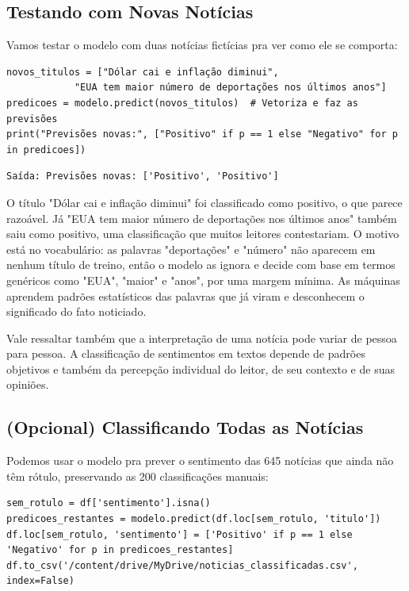 \documentclass[a4paper,12pt,openany]{book}
\begin{document}
\subsection{Testando com Novas Notícias}
Vamos testar o modelo com duas notícias fictícias pra ver como ele se comporta:

\begin{verbatim}
novos_titulos = ["Dólar cai e inflação diminui", 
            "EUA tem maior número de deportações nos últimos anos"]
predicoes = modelo.predict(novos_titulos)  # Vetoriza e faz as previsões
print("Previsões novas:", ["Positivo" if p == 1 else "Negativo" for p in predicoes])
\end{verbatim}
\begin{verbatim}
Saída: Previsões novas: ['Positivo', 'Positivo']
\end{verbatim}

O título "Dólar cai e inflação diminui" foi classificado como positivo, o que parece razoável. Já "EUA tem maior número de deportações nos últimos anos" também saiu como positivo, uma classificação que muitos leitores contestariam. O motivo está no vocabulário: as palavras "deportações" e "número" não aparecem em nenhum título de treino, então o modelo as ignora e decide com base em termos genéricos como "EUA", "maior" e "anos", por uma margem mínima. As máquinas aprendem padrões estatísticos das palavras que já viram e desconhecem o significado do fato noticiado.

Vale ressaltar também que a interpretação de uma notícia pode variar de pessoa para pessoa. A classificação de sentimentos em textos depende de padrões objetivos e também da percepção individual do leitor, de seu contexto e de suas opiniões.

\subsection{(Opcional) Classificando Todas as Notícias}
Podemos usar o modelo pra prever o sentimento das 645 notícias que ainda não têm rótulo, preservando as 200 classificações manuais:
\begin{verbatim}
sem_rotulo = df['sentimento'].isna()
predicoes_restantes = modelo.predict(df.loc[sem_rotulo, 'titulo'])
df.loc[sem_rotulo, 'sentimento'] = ['Positivo' if p == 1 else 'Negativo' for p in predicoes_restantes]
df.to_csv('/content/drive/MyDrive/noticias_classificadas.csv', index=False)
\end{verbatim}
\end{document}
